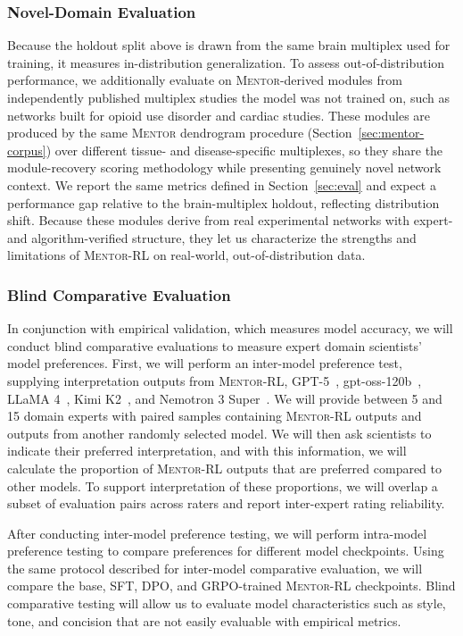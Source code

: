 \documentclass[thesis,letterpaper,12pt]{utthesis}
\begin{document}
\subsubsection{Novel-Domain Evaluation}
Because the holdout split above is drawn from the same brain multiplex used for training, it measures in-distribution generalization. To assess out-of-distribution performance, we additionally evaluate on \textsc{Mentor}-derived modules from independently published multiplex studies the model was not trained on, such as networks built for opioid use disorder and cardiac studies. These modules are produced by the same \textsc{Mentor} dendrogram procedure (Section~\ref{sec:mentor-corpus}) over different tissue- and disease-specific multiplexes, so they share the module-recovery scoring methodology while presenting genuinely novel network context. We report the same metrics defined in Section~\ref{sec:eval} and expect a performance gap relative to the brain-multiplex holdout, reflecting distribution shift. Because these modules derive from real experimental networks with expert- and algorithm-verified structure, they let us characterize the strengths and limitations of \textsc{Mentor-RL} on real-world, out-of-distribution data.

\subsubsection{Blind Comparative Evaluation}\label{sec:blind-eval}
In conjunction with empirical validation, which measures model accuracy, we will conduct blind comparative evaluations to measure expert domain scientists' model preferences. First, we will perform an inter-model preference test, supplying interpretation outputs from \textsc{Mentor-RL}, GPT-5~\cite{gpt5}, gpt-oss-120b~\cite{gpt-oss}, LLaMA 4~\cite{llama4}, Kimi K2~\cite{kimik2}, and Nemotron 3 Super~\cite{nemotron3}. We will provide between 5 and 15 domain experts with paired samples containing \textsc{Mentor-RL} outputs and outputs from another randomly selected model. We will then ask scientists to indicate their preferred interpretation, and with this information, we will calculate the proportion of \textsc{Mentor-RL} outputs that are preferred compared to other models. To support interpretation of these proportions, we will overlap a subset of evaluation pairs across raters and report inter-expert rating reliability.

After conducting inter-model preference testing, we will perform intra-model preference testing to compare preferences for different model checkpoints. Using the same protocol described for inter-model comparative evaluation, we will compare the base, SFT, DPO, and GRPO-trained \textsc{Mentor-RL} checkpoints. Blind comparative testing will allow us to evaluate model characteristics such as style, tone, and concision that are not easily evaluable with empirical metrics.
\end{document}
